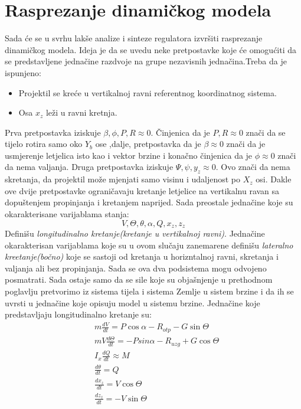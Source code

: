 \section{Rasprezanje dinamičkog modela}
Sada će se u svrhu lakše analize i sinteze regulatora izvršiti rasprezanje dinamičkog modela. Ideja je 
da se uvedu neke pretpostavke koje će omogućiti da se predstavljene jednačine razdvoje na grupe 
nezavisnih jednačina.Treba da je ispunjeno:
\begin{itemize}
    \item Projektil se kreće u vertikalnoj ravni referentnog koordinatnog sistema.
    \item Osa $x_z$ leži u ravni kretnja.
\end{itemize}
Prva pretpostavka iziskuje $\beta , \phi , P, R\approx 0$. Činjenica da je $P,R \approx 0$ znači da se tijelo rotira samo oko $Y_b$ ose
,dalje, pretpostavka da je $\beta \approx 0$ znači da je usmjerenje letjelica isto kao i vektor brzine i konačno činjenica 
da je $\phi \approx 0$ znači da nema valjanja.  
Druga pretpostavka iziskuje $\Psi, \psi, y_z\approx 0$. Ovo znači da nema skretanja, da projektil može mjenjati samo visinu i udaljenost po $X_z$ osi.
Dakle ove dvije pretpostavke ograničavaju kretanje letjelice na vertikalnu ravan sa dopuštenjem propinjanja i kretanjem naprijed. 
Sada preostale jednačine koje su okarakterisane varijablama stanja:
\[V,\Theta,\theta,\alpha,Q,x_z, z_z\]
Definišu \textit{longitudinalno kretanje(kretanje u vertikalnoj ravni)}. Jednačine okarakterisan varijablama 
koje su u ovom slučaju zanemarene definišu \textit{lateralno kreetanje(bočno)} koje se sastoji 
od kretanja u horizntalnoj ravni, skretanja i valjanja ali bez propinjanja. Sada se ova dva podsistema mogu odvojeno posmatrati.
Sada ostaje samo da se sile koje su objašnjenje u prethodnom poglavlju pretvorimo iz sistema tijela 
i sistema Zemlje u sistem brzine i da ih se uvrsti u jednačine koje opisuju model u sistemu brzine. 
Jednačine koje predstavljaju longitudinalno kretanje su:
\begin{align}
    &m\frac{dV}{dt}= P\cos\alpha - R_{otp} - G\sin\Theta\\
    &mV\frac{d\Theta}{dt} = -Psin\alpha - R_{uzg} + G\cos\Theta\\
    &I_x\frac{dQ}{dt} \approx M\\
    &\frac{d\theta}{dt}=Q\\
    &\frac{dx_z}{dt}=V\cos\Theta\\
    &\frac{dz_z}{dt}=-V\sin\Theta
\end{align}
